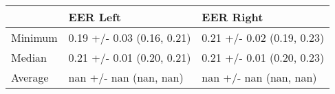 \begin{tabular}{lll}
\toprule
{} &                    EER Left &                   EER Right \\
\midrule
Minimum &  0.19 +/- 0.03 (0.16, 0.21) &  0.21 +/- 0.02 (0.19, 0.23) \\
Median  &  0.21 +/- 0.01 (0.20, 0.21) &  0.21 +/- 0.01 (0.20, 0.23) \\
Average &      nan +/- nan (nan, nan) &      nan +/- nan (nan, nan) \\
\bottomrule
\end{tabular}
